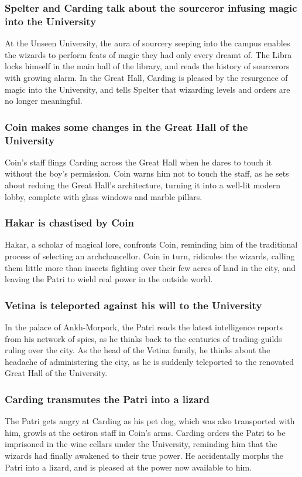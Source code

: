 \subsubsection{\Gls{Spelter} and \Gls{Carding} talk about the sourceror infusing magic into the
    University}
At the Unseen University, the aura of sourcery seeping into the campus enables the wizards to
perform feats of magic they had only every dreamt of. The \Gls{Libra} locks himself in the main hall
of the library, and reads the history of sourcerors with growing alarm. In the Great Hall,
\Gls{Carding} is pleased by the resurgence of magic into the University, and tells \Gls{Spelter}
that wizarding levels and orders are no longer meaningful.

\subsubsection{\Gls{Coin} makes some changes in the Great Hall of the University}
\Gls{Coin}'s staff flings \Gls{Carding} across the Great Hall when he dares to touch it without
the boy's permission. \Gls{Coin} warns him not to touch the staff, as he sets about redoing the
Great Hall's architecture, turning it into a well-lit modern lobby, complete with glass windows and
marble pillars.

\subsubsection{\Gls{Hakar} is chastised by \Gls{Coin}}
\Gls{Hakar}, a scholar of magical lore, confronts \Gls{Coin}, reminding him of the traditional
process of selecting an archchancellor. \Gls{Coin} in turn, ridicules the wizards, calling them
little more than insects fighting over their few acres of land in the city, and leaving the
\Gls{Patri} to wield real power in the outside world.

\subsubsection{\Gls{Vetina} is teleported against his will to the University}
In the palace of Ankh-Morpork, the \Gls{Patri} reads the latest intelligence reports from his
network of spies, as he thinks back to the centuries of trading-guilds ruling over the city.
As the head of the \Gls{Vetina} family, he thinks about the headache of administering the city,
as he is suddenly teleported to the renovated Great Hall of the University.

\subsubsection{\Gls{Carding} transmutes the \Gls{Patri} into a lizard}
The \Gls{Patri} gets angry at \Gls{Carding} as his pet dog, which was also transported with him,
growls at the octiron staff in \Gls{Coin}'s arms. \Gls{Carding} orders the \Gls{Patri} to be
imprisoned in the wine cellars under the University, reminding him that the wizards had finally
awakened to their true power. He accidentally morphs the \Gls{Patri} into a lizard, and is pleased
at the power now available to him.

